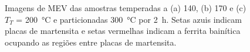 \begin{figure}
  \centering
  \quad
  \vspace{0pt}
  \caption{Imagens de MEV das amostras temperadas a (a) 140, (b) 170 e (c) $T_T$ = \SI{200}{\degreeCelsius} e particionadas \SI{300}{\degreeCelsius} por 2~h. Setas azuis indicam placas de martensita e setas vermelhas indicam a ferrita bainítica ocupando as regiões entre placas de martensita.}
  \label{fig:TP300MEV}
\end{figure}


